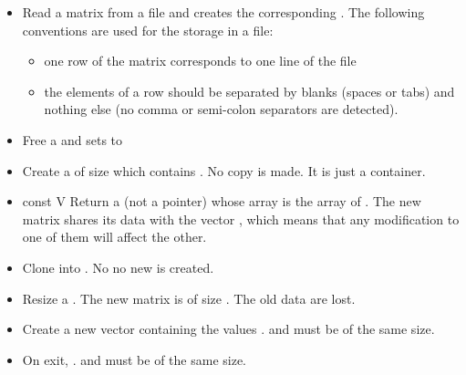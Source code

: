 \begin{itemize}
\item {}
  \sshortdescribe Read a matrix from a file and creates the corresponding
  \PnlMat. The following conventions are used for the storage in a
  file:
  \begin{itemize}
  \item one row of the matrix corresponds to one line of the file
  \item the elements of a row should be separated by blanks (spaces or tabs) and
    nothing else (no comma or semi-colon separators are detected).
  \end{itemize}

\item {}
  \sshortdescribe Free a \PnlMat and sets  to  
\item {}
    \sshortdescribe Create a \PnlMat of size  
    which contains . No copy is made. It is just a container.
\item {}
  {const \PnlVect \ptr V}
  \sshortdescribe Return a \PnlMat (not a pointer) whose array is
  the array of . The new matrix shares its data with the
  vector , which means that any modification to one of them will affect
  the other.


\item {}
  \sshortdescribe Clone  into . No no new
  \PnlMat is created.

\item {}
  \sshortdescribe Resize a \PnlMat. The new matrix is of size
  . The old data are lost.
\item {}
  \sshortdescribe Create a new vector containing the values .  and  must be of the same size.

\item {}
  \sshortdescribe On exit, .  and
   must be of the same size.


\end{itemize}
